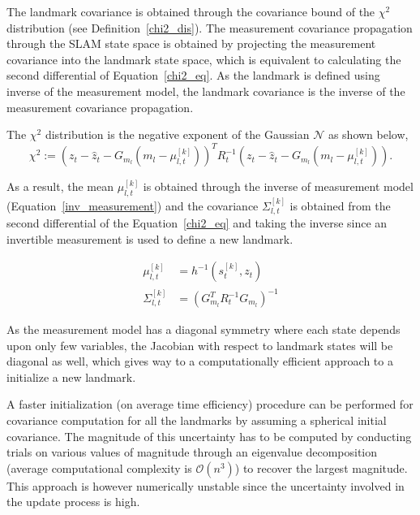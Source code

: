 The landmark covariance is obtained through the covariance bound of the $\chi^2$ distribution (see Definition~\ref{chi2_dis}). The measurement covariance propagation through the SLAM state space is obtained by projecting the measurement covariance into the landmark state space, which is equivalent to calculating the second differential of Equation~\ref{chi2_eq}. As the landmark is defined using inverse of the measurement model, the landmark covariance is the inverse of the measurement covariance propagation.

\begin{defn}
The $\chi^2$ distribution is the negative exponent of the Gaussian $\mathcal{N}$ as shown below,
\begin{equation}
\chi^2 := \left(z_t-\hat{z}_t-G_{m_l}(m_l-\mu^{[k]}_{l,t})\right)^TR_t^{-1}\left(z_t-\hat{z}_t-G_{m_l}(m_l-\mu^{[k]}_{l,t})\right).
\label{chi2_eq}
\end{equation}
\label{chi2_dis}
\end{defn}

As a result, the mean $\mu^{[k]}_{l,t}$ is obtained through the inverse of measurement model (Equation~\ref{inv_measurement}) and the covariance $\Sigma^{[k]}_{l,t}$ is obtained from the second differential of the Equation~\ref{chi2_eq} and taking the inverse since an invertible measurement is used to define a new landmark.

\begin{align}
\mu^{[k]}_{l,t} &= h^{-1}\left(s^{[k]}_t,z_t\right) \label{landmark_init1}\\
\Sigma^{[k]}_{l,t} &= \left(G_{m_l}^TR_t^{-1}G_{m_l}\right)^{-1} \label{landmark_init2}
\end{align}

As the measurement model has a diagonal symmetry where each state depends upon only few variables, the Jacobian with respect to landmark states will be diagonal as well, which gives way to a computationally efficient approach to a initialize a new landmark.

A faster initialization (on average time efficiency) procedure can be performed for covariance computation for all the landmarks by assuming a spherical initial covariance. The magnitude of this uncertainty has to be computed by conducting trials on various values of magnitude through an eigenvalue decomposition (average computational complexity is $\mathcal{O}(n^3)$) to recover the largest magnitude. This approach is however numerically unstable since the uncertainty involved in the update process is high.

